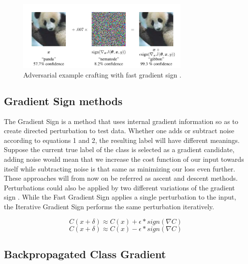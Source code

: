 \documentclass[runningheads,a4paper]{llncs}
\begin{document}
\begin{figure}
	\centering
	\includegraphics[height=3.5cm]{panda.png}
	\caption{Adversarial example crafting with fast gradient sign \cite{goodfellow2014}.}
	\label{fig:fgsm_craft}
\end{figure}

\subsection{Gradient Sign methods}

The Gradient Sign is a method that uses internal gradient information so as to create directed perturbation to test data. Whether one adds or subtract noise according to equations 1 and 2, the resulting label will have different meanings. Suppose the current true label of the class is selected as a gradient candidate, adding noise would mean that we increase the cost function of our input towards itself while subtracting noise is that same as minimizing our loss even further. These approaches will from now on be referred as ascent and descent methods. Perturbations could also be applied by two different variations of the gradient sign \cite{goodfellow2014}. While the Fast Gradient Sign applies a single perturbation to the input, the Iterative Gradient Sign performs the same perturbation iteratively.


\begin{equation}
C(x + \delta)\approx C(x) + \epsilon * sign(\nabla C)
\end{equation}
\begin{equation}
C(x + \delta)\approx C(x) - \epsilon * sign(\nabla C)
\end{equation}

\subsection{Backpropagated Class Gradient}
\end{document}
